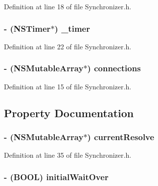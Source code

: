 Definition at line 18 of file Synchronizer.h.

\hypertarget{interface_synchronizer_a7c4b3e8add18b09f83d6a5432c7eb9ad}{
\subsubsection[{\_\-timer}]{\setlength{\rightskip}{0pt plus 5cm}-\/ (NSTimer$\ast$) {\bf \_\-timer}}}
\label{interface_synchronizer_a7c4b3e8add18b09f83d6a5432c7eb9ad}


Definition at line 22 of file Synchronizer.h.

\hypertarget{interface_synchronizer_ab614350bf23f5280a2b4bb8df11e893b}{
\subsubsection[{connections}]{\setlength{\rightskip}{0pt plus 5cm}-\/ (NSMutableArray$\ast$) {\bf connections}}}
\label{interface_synchronizer_ab614350bf23f5280a2b4bb8df11e893b}


Definition at line 15 of file Synchronizer.h.



\subsection{Property Documentation}
\hypertarget{interface_synchronizer_a14d57daa103c8eb50b3ad4c7da798ae4}{
\subsubsection[{currentResolve}]{\setlength{\rightskip}{0pt plus 5cm}-\/ (NSMutableArray$\ast$) currentResolve}}
\label{interface_synchronizer_a14d57daa103c8eb50b3ad4c7da798ae4}


Definition at line 35 of file Synchronizer.h.

\hypertarget{interface_synchronizer_a3c2dbcfb2f110502370a12870883471f}{
\subsubsection[{initialWaitOver}]{\setlength{\rightskip}{0pt plus 5cm}-\/ (BOOL) initialWaitOver}}
\label{interface_synchronizer_a3c2dbcfb2f110502370a12870883471f}


